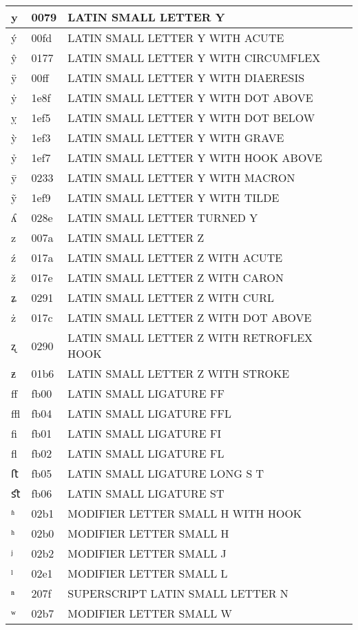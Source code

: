 \documentclass[12pt,letterpaper,openany]{book}
\begin{document}
\begin{center}
\begin{supertabular}{|m{0.25in}|m{0.5in}|m{4in}|}
y & 0079 & LATIN SMALL LETTER Y\\\hline
ý & 00fd & LATIN SMALL LETTER Y WITH ACUTE\\\hline
ŷ & 0177 & LATIN SMALL LETTER Y WITH CIRCUMFLEX\\\hline
ÿ & 00ff & LATIN SMALL LETTER Y WITH DIAERESIS\\\hline
ẏ & 1e8f & LATIN SMALL LETTER Y WITH DOT ABOVE\\\hline
ỵ & 1ef5 & LATIN SMALL LETTER Y WITH DOT BELOW\\\hline
ỳ & 1ef3 & LATIN SMALL LETTER Y WITH GRAVE\\\hline
ỷ & 1ef7 & LATIN SMALL LETTER Y WITH HOOK ABOVE\\\hline
ȳ & 0233 & LATIN SMALL LETTER Y WITH MACRON\\\hline
ỹ & 1ef9 & LATIN SMALL LETTER Y WITH TILDE\\\hline
ʎ & 028e & LATIN SMALL LETTER TURNED Y\\\hline
z & 007a & LATIN SMALL LETTER Z\\\hline
ź & 017a & LATIN SMALL LETTER Z WITH ACUTE\\\hline
ž & 017e & LATIN SMALL LETTER Z WITH CARON\\\hline
ʑ & 0291 & LATIN SMALL LETTER Z WITH CURL\\\hline
ż & 017c & LATIN SMALL LETTER Z WITH DOT ABOVE\\\hline
ʐ & 0290 & LATIN SMALL LETTER Z WITH RETROFLEX HOOK\\\hline
ƶ & 01b6 & LATIN SMALL LETTER Z WITH STROKE\\\hline
ﬀ & fb00 & LATIN SMALL LIGATURE FF\\\hline
ﬄ & fb04 & LATIN SMALL LIGATURE FFL\\\hline
ﬁ & fb01 & LATIN SMALL LIGATURE FI\\\hline
ﬂ & fb02 & LATIN SMALL LIGATURE FL\\\hline
ﬅ & fb05 & LATIN SMALL LIGATURE LONG S T\\\hline
ﬆ & fb06 & LATIN SMALL LIGATURE ST\\\hline
ʱ & 02b1 & MODIFIER LETTER SMALL H WITH HOOK\\\hline
ʰ & 02b0 & MODIFIER LETTER SMALL H\\\hline
ʲ & 02b2 & MODIFIER LETTER SMALL J\\\hline
ˡ & 02e1 & MODIFIER LETTER SMALL L\\\hline
ⁿ & 207f & SUPERSCRIPT LATIN SMALL LETTER N\\\hline
ʷ & 02b7 & MODIFIER LETTER SMALL W\\\hline

\end{supertabular}
\end{center}
\end{document}
